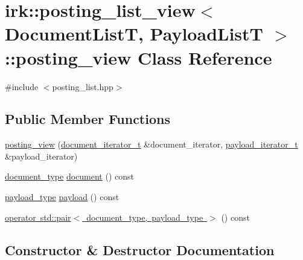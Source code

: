 \hypertarget{classirk_1_1posting__list__view_1_1posting__view}{}\section{irk\+:\+:posting\+\_\+list\+\_\+view$<$ Document\+ListT, Payload\+ListT $>$\+:\+:posting\+\_\+view Class Reference}
\label{classirk_1_1posting__list__view_1_1posting__view}


{\ttfamily \#include $<$posting\+\_\+list.\+hpp$>$}

\subsection*{Public Member Functions}
\begin{DoxyCompactItemize}
\item 
\mbox{\hyperlink{classirk_1_1posting__list__view_1_1posting__view_a7e6dc87b91ce5049bd42142088891e4f}{posting\+\_\+view}} (\mbox{\hyperlink{classirk_1_1posting__list__view_abaca622760e6da2c67d55cf35207250f}{document\+\_\+iterator\+\_\+t}} \&document\+\_\+iterator, \mbox{\hyperlink{classirk_1_1posting__list__view_a5a153169348a164ea2cb1a18dc76e279}{payload\+\_\+iterator\+\_\+t}} \&payload\+\_\+iterator)
\item 
\mbox{\hyperlink{classirk_1_1posting__list__view_ac4615e6e3d8ee1eb9a847b7a34919977}{document\+\_\+type}} \mbox{\hyperlink{classirk_1_1posting__list__view_1_1posting__view_a93ff0ec16a30711d2262e8a6372c30fe}{document}} () const
\item 
\mbox{\hyperlink{classirk_1_1posting__list__view_a1c394061061a8eeeab98cb228f6cdde9}{payload\+\_\+type}} \mbox{\hyperlink{classirk_1_1posting__list__view_1_1posting__view_a1cfdff00da3bfc7d42d0a487065ee9e5}{payload}} () const
\item 
\mbox{\hyperlink{classirk_1_1posting__list__view_1_1posting__view_acc98480fbaa34584c5150329d70cf721}{operator std\+::pair$<$ document\+\_\+type, payload\+\_\+type $>$}} () const
\end{DoxyCompactItemize}


\subsection{Constructor \& Destructor Documentation}
\mbox{\label{classirk_1_1posting__list__view_1_1posting__view_a7e6dc87b91ce5049bd42142088891e4f}} 
